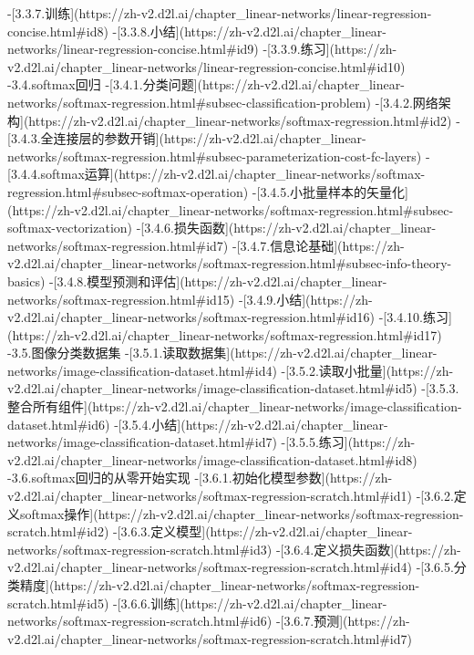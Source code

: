 -[3.3.7.训练](https://zh-v2.d2l.ai/chapter_linear-networks/linear-regression-concise.html#id8)
-[3.3.8.小结](https://zh-v2.d2l.ai/chapter_linear-networks/linear-regression-concise.html#id9)
-[3.3.9.练习](https://zh-v2.d2l.ai/chapter_linear-networks/linear-regression-concise.html#id10)
-3.4.softmax回归
-[3.4.1.分类问题](https://zh-v2.d2l.ai/chapter_linear-networks/softmax-regression.html#subsec-classification-problem)
-[3.4.2.网络架构](https://zh-v2.d2l.ai/chapter_linear-networks/softmax-regression.html#id2)
-[3.4.3.全连接层的参数开销](https://zh-v2.d2l.ai/chapter_linear-networks/softmax-regression.html#subsec-parameterization-cost-fc-layers)
-[3.4.4.softmax运算](https://zh-v2.d2l.ai/chapter_linear-networks/softmax-regression.html#subsec-softmax-operation)
-[3.4.5.小批量样本的矢量化](https://zh-v2.d2l.ai/chapter_linear-networks/softmax-regression.html#subsec-softmax-vectorization)
-[3.4.6.损失函数](https://zh-v2.d2l.ai/chapter_linear-networks/softmax-regression.html#id7)
-[3.4.7.信息论基础](https://zh-v2.d2l.ai/chapter_linear-networks/softmax-regression.html#subsec-info-theory-basics)
-[3.4.8.模型预测和评估](https://zh-v2.d2l.ai/chapter_linear-networks/softmax-regression.html#id15)
-[3.4.9.小结](https://zh-v2.d2l.ai/chapter_linear-networks/softmax-regression.html#id16)
-[3.4.10.练习](https://zh-v2.d2l.ai/chapter_linear-networks/softmax-regression.html#id17)
-3.5.图像分类数据集
-[3.5.1.读取数据集](https://zh-v2.d2l.ai/chapter_linear-networks/image-classification-dataset.html#id4)
-[3.5.2.读取小批量](https://zh-v2.d2l.ai/chapter_linear-networks/image-classification-dataset.html#id5)
-[3.5.3.整合所有组件](https://zh-v2.d2l.ai/chapter_linear-networks/image-classification-dataset.html#id6)
-[3.5.4.小结](https://zh-v2.d2l.ai/chapter_linear-networks/image-classification-dataset.html#id7)
-[3.5.5.练习](https://zh-v2.d2l.ai/chapter_linear-networks/image-classification-dataset.html#id8)
-3.6.softmax回归的从零开始实现
-[3.6.1.初始化模型参数](https://zh-v2.d2l.ai/chapter_linear-networks/softmax-regression-scratch.html#id1)
-[3.6.2.定义softmax操作](https://zh-v2.d2l.ai/chapter_linear-networks/softmax-regression-scratch.html#id2)
-[3.6.3.定义模型](https://zh-v2.d2l.ai/chapter_linear-networks/softmax-regression-scratch.html#id3)
-[3.6.4.定义损失函数](https://zh-v2.d2l.ai/chapter_linear-networks/softmax-regression-scratch.html#id4)
-[3.6.5.分类精度](https://zh-v2.d2l.ai/chapter_linear-networks/softmax-regression-scratch.html#id5)
-[3.6.6.训练](https://zh-v2.d2l.ai/chapter_linear-networks/softmax-regression-scratch.html#id6)
-[3.6.7.预测](https://zh-v2.d2l.ai/chapter_linear-networks/softmax-regression-scratch.html#id7)
